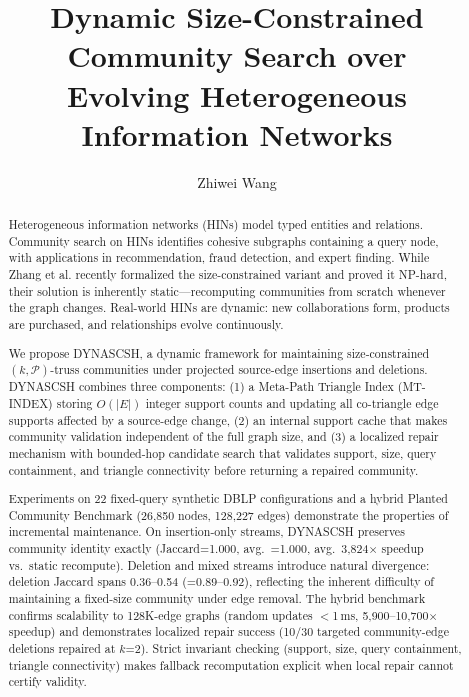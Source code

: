 \documentclass[sigconf, nonacm]{acmart}
\newcommand{\DynaSCSH}{\textsc{DYNASCSH}\xspace}
\newcommand{\mtindex}{\textsc{MT-INDEX}\xspace}
\newcommand{\qratio}{\text{$Q$-Ratio}\xspace}
\begin{document}
\title[Dynamic Size-Constrained Community Search]{Dynamic Size-Constrained Community Search over\texorpdfstring{\\}{ }Evolving Heterogeneous Information Networks}

\author{Zhiwei Wang}

\begin{abstract}
Heterogeneous information networks (HINs) model typed entities and relations. Community search on HINs identifies cohesive subgraphs containing a query node, with applications in recommendation, fraud detection, and expert finding. While Zhang et al. recently formalized the size-constrained variant and proved it NP-hard, their solution is inherently static---recomputing communities from scratch whenever the graph changes. Real-world HINs are dynamic: new collaborations form, products are purchased, and relationships evolve continuously.

We propose \DynaSCSH, a dynamic framework for maintaining size-constrained $(k,\mathcal{P})$-truss communities under projected source-edge insertions and deletions. \DynaSCSH combines three components: (1) a Meta-Path Triangle Index (\mtindex) storing $O(|E|)$ integer support counts and updating all co-triangle edge supports affected by a source-edge change, (2) an internal support cache that makes community validation independent of the full graph size, and (3) a localized repair mechanism with bounded-hop candidate search that validates support, size, query containment, and triangle connectivity before returning a repaired community.

Experiments on 22 fixed-query synthetic DBLP configurations and a hybrid Planted Community Benchmark (26,850 nodes, 128,227 edges) demonstrate the properties of incremental maintenance. On insertion-only streams, \DynaSCSH preserves community identity exactly (Jaccard=1.000, avg.\ \qratio=1.000, avg.\ 3,824$\times$ speedup vs.\ static recompute). Deletion and mixed streams introduce natural divergence: deletion Jaccard spans 0.36--0.54 (\qratio=0.89--0.92), reflecting the inherent difficulty of maintaining a fixed-size community under edge removal. The hybrid benchmark confirms scalability to 128K-edge graphs (random updates $<$1\,ms, 5,900--10,700$\times$ speedup) and demonstrates localized repair success (10/30 targeted community-edge deletions repaired at $k$=2). Strict invariant checking (support, size, query containment, triangle connectivity) makes fallback recomputation explicit when local repair cannot certify validity.
\end{abstract}

\maketitle

\vldbtopmatter










\end{document}
